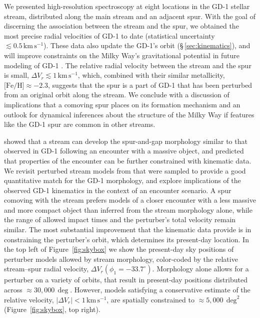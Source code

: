 \documentclass[twocolumn]{aastex63}
\newcommand{\kms}{\ensuremath{\textrm{km}\,\textrm{s}^{-1}}}
\newcommand{\feh}{\ensuremath{\textrm{[Fe/H]}}}
\begin{document}
We presented high-resolution spectroscopy at eight locations in the GD-1 stellar stream, distributed along the main stream and an adjacent spur.
With the goal of discerning the association between the stream and the spur, we obtained the most precise radial velocities of GD-1 to date (statistical uncertainty $\lesssim0.5\,\kms$).
These data also update the GD-1's orbit (\S\,\ref{sec:kinematics}), and will improve constraints on the Milky Way's gravitational potential in future modeling of GD-1 \citep[e.g.,][]{koposov2010, bowden2015}.
The relative radial velocity between the stream and the spur is small, $\Delta V_r\lesssim1\,\kms$, which, combined with their similar metallicity, $\feh\approx-2.3$, suggests that the spur is a part of GD-1 that has been perturbed from an original orbit along the stream.
We conclude with a discussion of implications that a comoving spur places on its formation mechanism and an outlook for dynamical inferences about the structure of the Milky Way if features like the GD-1 spur are common in other streams.

\citet{bonaca2019a} showed that a stream can develop the spur-and-gap morphology similar to that observed in GD-1 following an encounter with a massive object, and predicted that properties of the encounter can be further constrained with kinematic data.
We revisit perturbed stream models from \citet{bonaca2019a} that were sampled to provide a good quantitative match for the GD-1 morphology, and explore implications of the observed GD-1 kinematics in the context of an encounter scenario.
A spur comoving with the stream prefers models of a closer encounter with a less massive and more compact object than inferred from the stream morphology alone, while the range of allowed impact times and the perturber's total velocity remain similar.
The most substantial improvement that the kinematic data provide is in constraining the perturber's orbit, which determines its present-day location.
In the top left of Figure~\ref{fig:skybox} we show the present-day sky positions of perturber models allowed by stream morphology, color-coded by the relative stream--spur radial velocity, $\Delta V_r(\phi_1=-33.7^\circ)$.
Morphology alone allows for a perturber on a variety of orbits, that result in present-day positions distributed across $\approx30,000\,\deg$.
However, models satisfying a conservative estimate of the relative velocity, $|\Delta V_r|<1\,\kms$, are spatially constrained to $\approx5,000\,\deg^2$ (Figure~\ref{fig:skybox}, top right).
\end{document}
